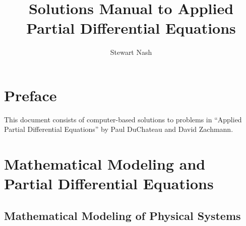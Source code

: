 \documentclass{amsbook}%
\theoremstyle{plain}
\numberwithin{equation}{section}
\begin{document}
\frontmatter
\title[Applied PDE Solutions]{Solutions Manual to Applied Partial Differential Equations}
\author[S. Nash]{Stewart Nash}


\maketitle
\tableofcontents

\chapter*{Preface}

 This document consists of computer-based solutions to problems in ``Applied Partial Differential Equations'' by Paul DuChateau and David Zachmann.

\mainmatter


\chapter{Mathematical Modeling and Partial Differential Equations}

	\section{Mathematical Modeling of Physical Systems}
\end{document}
